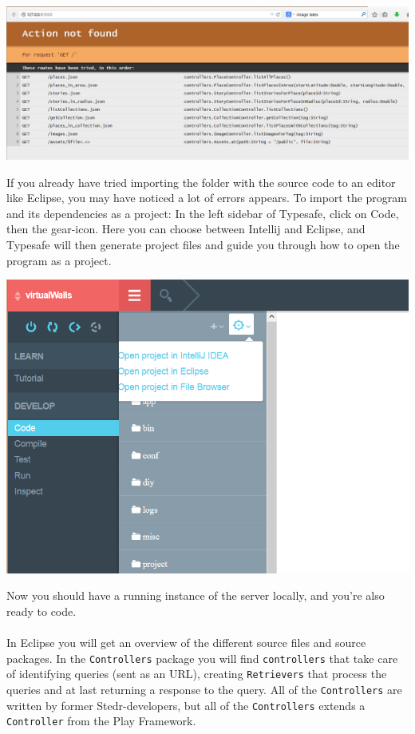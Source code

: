 \begin{center}
\includegraphics[scale=0.5]{guide/activator3.png} 
\end{center}

If you already have tried importing the folder with the source code to an editor like Eclipse, you may have noticed a lot of errors appears. To import the program and its dependencies as a project: In the left sidebar of Typesafe, click on Code, then the gear-icon. Here you can choose between Intellij and Eclipse, and Typesafe will then generate project files and guide you through how to open the program as a project. 
\begin{center}
\includegraphics[scale=0.6]{guide/activator4.png} 
\end{center}
Now you should have a running instance of the server locally, and you're also ready to code. 

\paragraph{}

In Eclipse you will get an overview of the different source files and source packages. In the \texttt{Controllers} package you will find \texttt{controllers} that take care of identifying queries (sent as an URL), creating \texttt{Retrievers} that process the queries and at last returning a response to the query. All of the  \texttt{Controllers} are written by former Stedr-developers, but all of the  \texttt{Controllers} extends a  \texttt{Controller} from the Play Framework.


